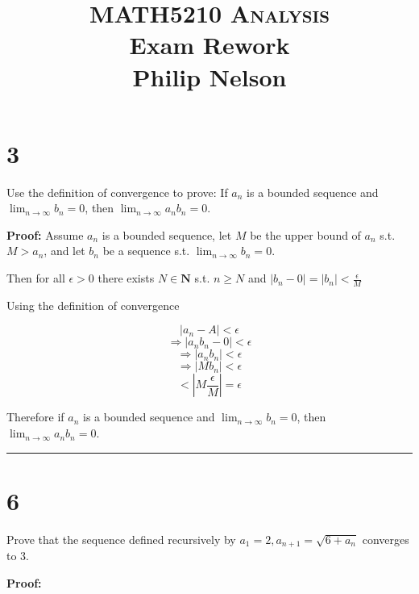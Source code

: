 \documentclass[12pt,letterpaper]{article}
\newcommand\N{\mathbf{N}}
\newcommand\ds{\displaystyle}
\newcommand\qedsym{\hfill \rule{2mm}{2mm}}
\begin{document}
\title{MATH5210 \textsc{Analysis}
  \\ Exam Rework
  \\ Philip Nelson
}

\date{}

\maketitle

\section*{3} Use the definition of convergence to prove: If $a_n$ is a bounded sequence and $\ds\lim_{n\to\infty} b_n = 0$, then $\ds\lim_{n\to\infty}a_n b_n = 0$.

\bigskip

\textbf{Proof:} Assume $a_n$ is a bounded sequence, let $M$ be the upper bound of $a_n$  s.t. $M > a_n$, and let $b_n$ be a sequence s.t. $\ds\lim_{n\to\infty}b_n = 0$.

Then for all $\epsilon > 0$ there exists $N \in \N$ s.t. $n \geq N$ and $|b_n - 0| = |b_n| < \frac{\epsilon}{M}$

Using the definition of convergence

\[|a_n - A| < \epsilon\]
\[\Rightarrow |a_n b_n - 0| < \epsilon\]
\[\Rightarrow |a_n b_n| < \epsilon\]
\[\Rightarrow |M b_n| < \epsilon\]
\[< |M \frac{\epsilon}{M}| = \epsilon\]

Therefore if $a_n$ is a bounded sequence and $\ds\lim_{n\to\infty} b_n = 0$, then $\ds\lim_{n\to\infty}a_n b_n = 0$.

\qedsym

\section*{6} Prove that the sequence defined recursively by $a_1 = 2, a_{n+1} = \sqrt{6+a_n}$ converges to 3.

\bigskip

\textbf{Proof:}
\end{document}
